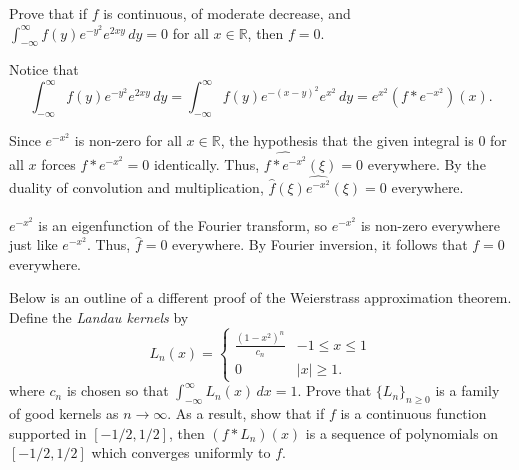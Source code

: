 \documentclass[12 pt, letterpaper]{hmcpset}
\begin{document}
\begin{problem}[S \& S \S 5.5 \#8]
	Prove that if $f$ is continuous, of moderate decrease, and $\int_{-\infty}^{\infty} f(y) e^{-y^{2}} e^{2 x y} \, dy = 0$ for all $x \in \mathbb{R}$, then $f = 0$.
\end{problem}

\begin{solution}
	Notice that
	\[
		\int_{-\infty}^{\infty} f(y) e^{-y^{2}} e^{2 xy} \, dy = \int_{-\infty}^{\infty} f(y) e^{-(x - y)^{2}} e^{x^{2}} \, dy = e^{x^{2}} (f * e^{-x^{2}})(x).
	\]

	Since $e^{-x^{2}}$ is non-zero for all $x \in \mathbb{R}$, the hypothesis that the given integral is $0$ for all $x$ forces $f * e^{-x^{2}} = 0$ identically. Thus, $\widehat{f * e^{-x^{2}}}(\xi) = 0$ everywhere. By the duality of convolution and multiplication, $\hat{f}(\xi) \widehat{e^{-x^{2}}}(\xi) = 0$ everywhere.

	$e^{-x^{2}}$ is an eigenfunction of the Fourier transform, so $\widehat{e^{-x^{2}}}$ is non-zero everywhere just like $e^{-x^{2}}$. Thus, $\hat{f} = 0$ everywhere. By Fourier inversion, it follows that $f = 0$ everywhere.
\end{solution}

\pagebreak

\begin{problem}[S \& S \S 5.5 \#10]
	Below is an outline of a different proof of the Weierstrass approximation theorem. Define the \emph{Landau kernels} by
	\[
		L_{n}(x) = \begin{cases}
			\frac{(1 - x^{2})^{n}}{c_{n}} & -1 \le x \le 1 \\
			0 & \lvert x \rvert \ge 1.
		\end{cases}
	\]
	where $c_{n}$ is chosen so that $\int_{-\infty}^{\infty} L_{n}(x) \, dx = 1$. Prove that $\{ L_{n} \}_{n \ge 0}$ is a family of good kernels as $n \to \infty$. As a result, show that if $f$ is a continuous function supported in $[-1/2, 1/2]$, then $(f * L_{n})(x)$ is a sequence of polynomials on $[-1/2, 1/2]$ which converges uniformly to $f$.
\end{problem}
\end{document}
